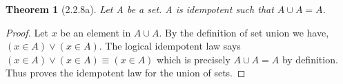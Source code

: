 \documentclass[a4paper, 12pt]{article}
\theoremstyle{plain}
\newtheorem*{theorem*}{Theorem}
\begin{document}
	
	\begin{theorem*}[2.2.8a]
		Let A be a set. A is idempotent such that $A \cup A = A$.
	\end{theorem*}
	
	\begin{proof}
		Let $x$ be an element in $A \cup A$. By the definition of set union we have, \newline 
		$(x \in A) \lor (x \in A)$. The logical idempotent law says \newline 
		$(x \in A) \lor (x \in A) \equiv (x \in A)$ which is precisely $A \cup A = A$ by definition. 
		Thus proves the idempotent law for the union of sets.
	\end{proof}
\end{document}
